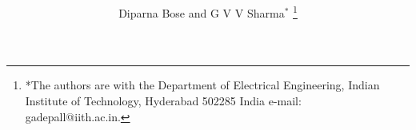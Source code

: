 \documentclass[journal,12pt,twocolumn]{IEEEtran}
\begin{document}
\def\putbox#1#2#3{\makebox[0in][l]{\makebox[#1][l]{}\raisebox{\baselineskip}[0in][0in]{\raisebox{#2}[0in][0in]{#3}}}}
     \def\rightbox#1{\makebox[0in][r]{#1}}
     \def\centbox#1{\makebox[0in]{#1}}
     \def\topbox#1{\raisebox{-\baselineskip}[0in][0in]{#1}}
     \def\midbox#1{\raisebox{-0.5\baselineskip}[0in][0in]{#1}}

\vspace{3cm}

\title{
}


%
%
%

\author{Diparna Bose and G V V Sharma$^{*}$%
\thanks{*The authors are with the Department
of Electrical Engineering, Indian Institute of Technology, Hyderabad
502285 India e-mail:  gadepall@iith.ac.in.}%
}
% 
%
\end{document}

